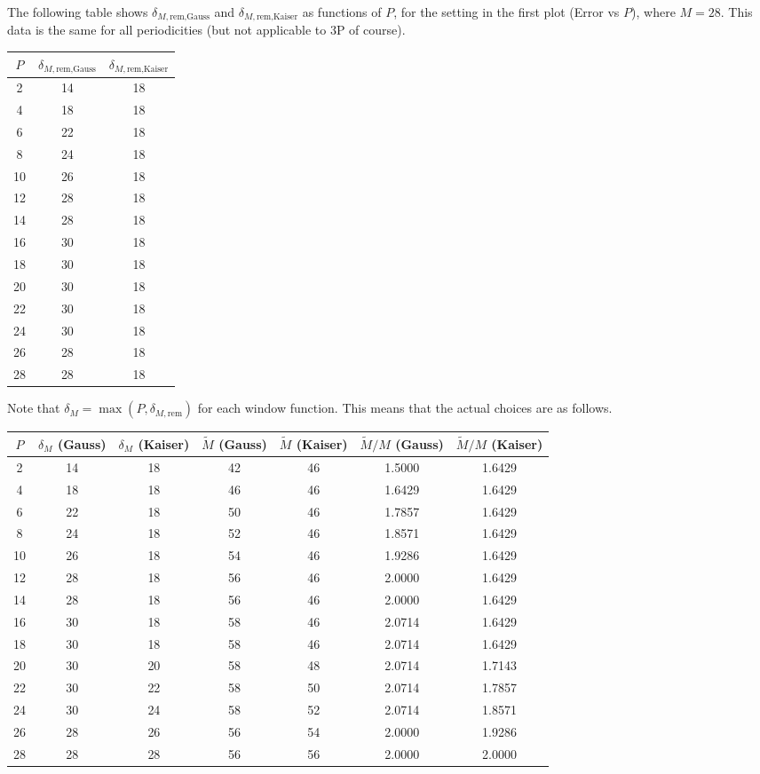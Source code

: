 \documentclass[a4paper,10pt]{article}
\begin{document}
The following table shows $\delta_{M,\text{rem,Gauss}}$ and
$\delta_{M,\text{rem,Kaiser}}$ as functions of $P$, for the
setting in the first plot (Error vs $P$), where $M=28$. This data is
the same for all periodicities (but not applicable to 3P of
course).
\begin{center}
  \begin{tabular}{ccc}
    \toprule
    $P$ & $\delta_{M,\text{rem,Gauss}}$ & $\delta_{M,\text{rem,Kaiser}}$ \\
    \midrule
     2 & 14 & 18 \\
     4 & 18 & 18 \\
     6 & 22 & 18 \\
     8 & 24 & 18 \\
    10 & 26 & 18 \\
    12 & 28 & 18 \\
    14 & 28 & 18 \\
    16 & 30 & 18 \\
    18 & 30 & 18 \\
    20 & 30 & 18 \\
    22 & 30 & 18 \\
    24 & 30 & 18 \\
    26 & 28 & 18 \\
    28 & 28 & 18 \\
    \bottomrule
  \end{tabular}
\end{center}
Note that $\delta_M = \max(P, \delta_{M,\text{rem}})$ for each
window function. This means that the actual choices are as
follows.
\begin{center}
  \begin{tabular}{ccccccc}
    \toprule
    $P$ & $\delta_M$ (Gauss) & $\delta_M$ (Kaiser) & $\tilde{M}$
    (Gauss) & $\tilde{M}$ (Kaiser) & $\tilde{M}/M$ (Gauss) &
    $\tilde{M}/M$ (Kaiser) \\
    \midrule
     2 & 14 & 18 & 42 & 46 & 1.5000 & 1.6429 \\
     4 & 18 & 18 & 46 & 46 & 1.6429 & 1.6429 \\
     6 & 22 & 18 & 50 & 46 & 1.7857 & 1.6429 \\
     8 & 24 & 18 & 52 & 46 & 1.8571 & 1.6429 \\
    10 & 26 & 18 & 54 & 46 & 1.9286 & 1.6429 \\
    12 & 28 & 18 & 56 & 46 & 2.0000 & 1.6429 \\
    14 & 28 & 18 & 56 & 46 & 2.0000 & 1.6429 \\
    16 & 30 & 18 & 58 & 46 & 2.0714 & 1.6429 \\
    18 & 30 & 18 & 58 & 46 & 2.0714 & 1.6429 \\
    20 & 30 & 20 & 58 & 48 & 2.0714 & 1.7143 \\
    22 & 30 & 22 & 58 & 50 & 2.0714 & 1.7857 \\
    24 & 30 & 24 & 58 & 52 & 2.0714 & 1.8571 \\
    26 & 28 & 26 & 56 & 54 & 2.0000 & 1.9286 \\
    28 & 28 & 28 & 56 & 56 & 2.0000 & 2.0000 \\
    \bottomrule
  \end{tabular}
\end{center}
\end{document}
